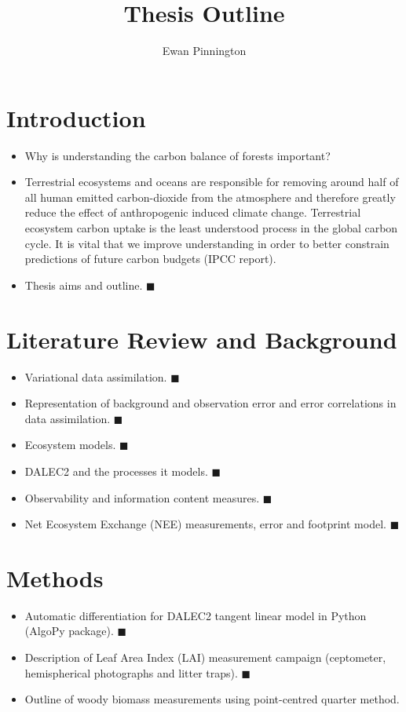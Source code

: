 \documentclass[11pt]{article}
\title{Thesis Outline}
\author{Ewan Pinnington}
\begin{document}
\maketitle
\section{Introduction}
\begin{itemize}
\item Why is understanding the carbon balance of forests important?
\item Terrestrial ecosystems and oceans are responsible for removing around half of all human emitted carbon-dioxide from the atmosphere and therefore greatly reduce the effect of anthropogenic induced climate change. Terrestrial ecosystem carbon uptake is the least understood process in the global carbon cycle. It is vital that we improve understanding in order to better constrain predictions of future carbon budgets (IPCC report).
\item Thesis aims and outline. {\color{yellow} $\blacksquare$}
\end{itemize}


\section{Literature Review and Background}
\begin{itemize}
\item Variational data assimilation. {\color{yellow} $\blacksquare$}
\item Representation of background and observation error and error correlations in data assimilation. {\color{yellow} $\blacksquare$}
\item Ecosystem models. {\color{yellow} $\blacksquare$}
\item DALEC2 and the processes it models. {\color{yellow} $\blacksquare$}
\item Observability and information content measures. {\color{yellow} $\blacksquare$}
\item Net Ecosystem Exchange (NEE) measurements, error and footprint model. {\color{yellow} $\blacksquare$}
\end{itemize}


\section{Methods}
\begin{itemize}
\item Automatic differentiation for DALEC2 tangent linear model in Python (AlgoPy package). {\color{yellow} $\blacksquare$}
\item Description of Leaf Area Index (LAI) measurement campaign (ceptometer, hemispherical photographs and litter traps). {\color{yellow} $\blacksquare$}
\item Outline of woody biomass measurements using point-centred quarter method.
\end{itemize}
\end{document}
